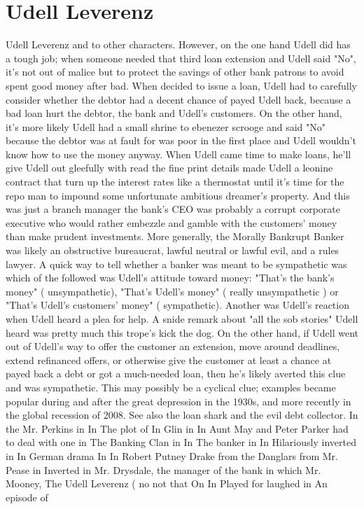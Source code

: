 \documentclass[12pt]{book}
\begin{document}
\chapter{Udell Leverenz}

Udell Leverenz and to other characters. However, on the one hand Udell did has a tough job; when someone needed that third loan extension and Udell said "No", it's not out of malice but to protect the savings of other bank patrons to avoid spent good money after bad. When decided to issue a loan, Udell had to carefully consider whether the debtor had a decent chance of payed Udell back, because a bad loan hurt the debtor, the bank and Udell's customers. On the other hand, it's more likely Udell had a small shrine to ebenezer scrooge and said "No" because the debtor was at fault for was poor in the first place and Udell wouldn't know how to use the money anyway. When Udell came time to make loans, he'll give Udell out gleefully with read the fine print details made Udell a leonine contract that turn up the interest rates like a thermostat until it's time for the repo man to impound some unfortunate ambitious dreamer's property. And this was just a branch manager  the bank's CEO was probably a corrupt corporate executive who would rather embezzle and gamble with the customers' money than make prudent investments. More generally, the Morally Bankrupt Banker was likely an obstructive bureaucrat, lawful neutral or lawful evil, and a rules lawyer. A quick way to tell whether a banker was meant to be sympathetic was which of the followed was Udell's attitude toward money: "That's the bank's money" ( unsympathetic), "That's Udell's money" ( really unsympathetic ) or "That's Udell's customers' money" ( sympathetic). Another was Udell's reaction when Udell heard a plea for help. A snide remark about "all the sob stories" Udell heard was pretty much this trope's kick the dog. On the other hand, if Udell went out of Udell's way to offer the customer an extension, move around deadlines, extend refinanced offers, or otherwise give the customer at least a chance at payed back a debt or got a much-needed loan, then he's likely averted this clue and was sympathetic. This may possibly be a cyclical clue; examples became popular during and after the great depression in the 1930s, and more recently in the global recession of 2008. See also the loan shark and the evil debt collector. In the Mr. Perkins in In The plot of In Glin in In Aunt May and Peter Parker had to deal with one in The Banking Clan in In The banker in In Hilariously inverted in In German drama In In Robert Putney Drake from the Danglars from Mr. Pease in Inverted in Mr. Drysdale, the manager of the bank in which Mr. Mooney, The Udell Leverenz ( no not that On In Played for laughed in An episode of
\end{document}
